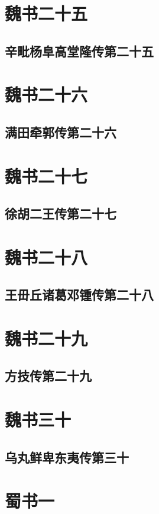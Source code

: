 \documentclass[12pt,UTF8]{ctexbook}
\begin{document}
\part{魏书二十五}
\chapter{辛毗杨阜高堂隆传第二十五}

\part{魏书二十六}
\chapter{满田牵郭传第二十六}

\part{魏书二十七}
\chapter{徐胡二王传第二十七}

\part{魏书二十八}
\chapter{王毌丘诸葛邓锺传第二十八}

\part{魏书二十九}
\chapter{方技传第二十九}

\part{魏书三十}
\chapter{乌丸鲜卑东夷传第三十}

\part{蜀书一}
\end{document}
